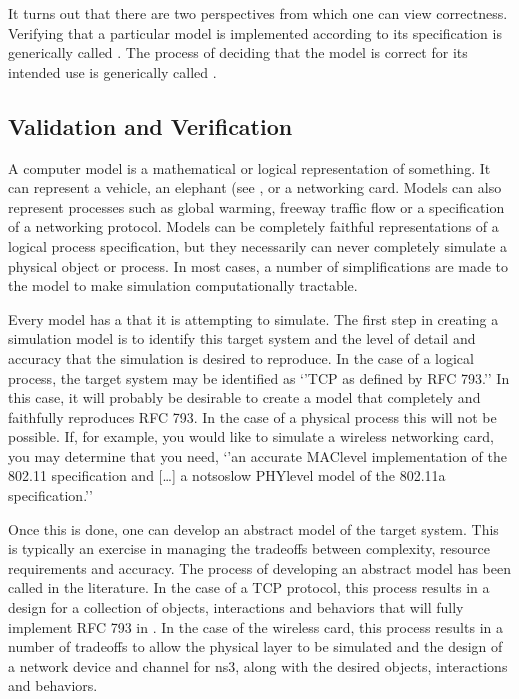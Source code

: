 \documentclass[letterpaper,10pt,english]{sphinxmanual}
\begin{document}
It turns out that there are two perspectives from which one can view
correctness.  Verifying that a particular model is implemented according
to its specification is generically called .  The process of
deciding that the model is correct for its intended use is generically called
.


\subsection{Validation and Verification}
\label{\detokenize{test-background:validation-and-verification}}
A computer model is a mathematical or logical representation of something. It
can represent a vehicle, an elephant (see
, or a networking card.  Models can also represent
processes such as global warming, freeway traffic flow or a specification of a
networking protocol.  Models can be completely faithful representations of a
logical process specification, but they necessarily can never completely
simulate a physical object or process.  In most cases, a number of
simplifications are made to the model to make simulation computationally
tractable.

Every model has a  that it is attempting to simulate.  The
first step in creating a simulation model is to identify this target system and
the level of detail and accuracy that the simulation is desired to reproduce.
In the case of a logical process, the target system may be identified as ‘’TCP
as defined by RFC 793.’’  In this case, it will probably be desirable to create
a model that completely and faithfully reproduces RFC 793.  In the case of a
physical process this will not be possible. If, for example, you would like to
simulate a wireless networking card, you may determine that you need,  ‘’an
accurate MAC\sphinxhyphen{}level implementation of the 802.11 specification and {[}…{]} a
not\sphinxhyphen{}so\sphinxhyphen{}slow PHY\sphinxhyphen{}level model of the 802.11a specification.’’

Once this is done, one can develop an abstract model of the target system.  This
is typically an exercise in managing the tradeoffs between complexity, resource
requirements and accuracy.  The process of developing an abstract model has been
called  in the literature.  In the case of a TCP
protocol, this process results in a design for a collection of objects,
interactions and behaviors that will fully implement RFC 793 in .
In the case of the wireless card, this process results in a number of tradeoffs
to allow the physical layer to be simulated and the design of a network device
and channel for ns\sphinxhyphen{}3, along with the desired objects, interactions and behaviors.
\end{document}
